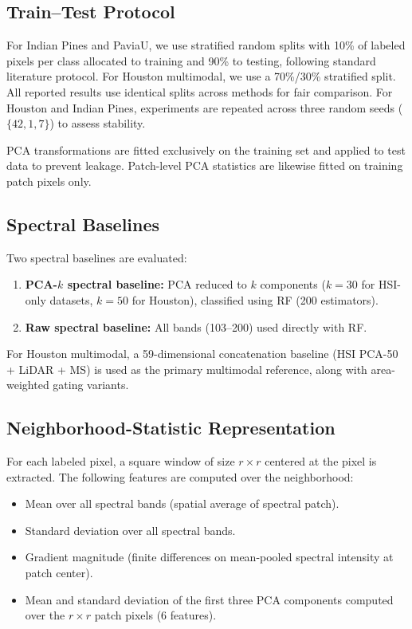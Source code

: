 \documentclass[journal]{IEEEtran}
\begin{document}
\subsection{Train--Test Protocol}

For Indian Pines and PaviaU, we use stratified random splits with
10\% of labeled pixels per class allocated to training and 90\% to
testing, following standard literature protocol. For Houston
multimodal, we use a 70\%/30\% stratified split. All reported results
use identical splits across methods for fair comparison. For Houston
and Indian Pines, experiments are repeated across three random seeds
($\{42, 1, 7\}$) to assess stability.

PCA transformations are fitted exclusively on the training set and
applied to test data to prevent leakage. Patch-level PCA statistics
are likewise fitted on training patch pixels only.

\subsection{Spectral Baselines}

Two spectral baselines are evaluated:
\begin{enumerate}
  \item \textbf{PCA-$k$ spectral baseline:} PCA reduced to $k$
    components ($k{=}30$ for HSI-only datasets, $k{=}50$ for Houston),
    classified using RF (200 estimators).
  \item \textbf{Raw spectral baseline:} All bands (103--200) used
    directly with RF.
\end{enumerate}

For Houston multimodal, a 59-dimensional concatenation baseline
(HSI PCA-50 + LiDAR + MS) is used as the primary multimodal
reference, along with area-weighted gating variants.

\subsection{Neighborhood-Statistic Representation}

For each labeled pixel, a square window of size $r{\times}r$ centered
at the pixel is extracted. The following features are computed over
the neighborhood:
\begin{itemize}
  \item Mean over all spectral bands (spatial average of spectral
    patch).
  \item Standard deviation over all spectral bands.
  \item Gradient magnitude (finite differences on mean-pooled spectral
    intensity at patch center).
  \item Mean and standard deviation of the first three PCA components
    computed over the $r{\times}r$ patch pixels (6 features).
\end{itemize}
\end{document}

